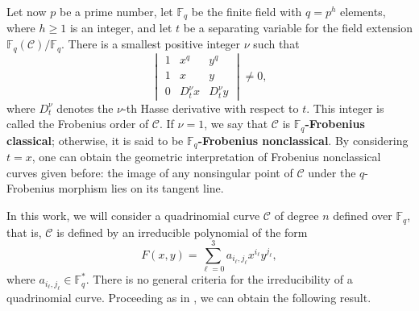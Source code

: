 \documentclass[preprint,12pt]{elsarticle}
\newtheorem{remark}[theorem]{Remark}
\begin{document}
Let now \( p \) be a prime number, let \( \mathbb{F}_q \) be the finite field with \( q = p^h \) elements, where \( h \geq 1 \) is an integer, and let $t$ be a separating variable for the field extension $\mathbb{F}_q(\mathcal{C}) / \mathbb{F}_q$. There is a smallest positive integer $\nu$ such that
\[
\begin{vmatrix}
1 & x^q & y^q \\
1 & x & y \\
0 & D_t^{\nu} x & D_t^{\nu} y
\end{vmatrix}
\neq 0,
\]
where $D_t^{\nu}$ denotes the $\nu$-th Hasse derivative with respect to $t$. This integer is called the Frobenius order  of \( \mathcal{C} \). If \( \nu = 1 \), we say that \( \mathcal{C} \) is \textbf{\( \mathbb{F}_q \)-Frobenius classical}; otherwise, it is said to be \textbf{\( \mathbb{F}_q \)-Frobenius nonclassical}. By considering $t = x$, one can obtain the geometric interpretation of Frobenius nonclassical curves given before: the image of any nonsingular point of $\mathcal{C}$ under the $q$-Frobenius morphism lies on its tangent line.


In this work, we will consider a quadrinomial curve \( \mathcal{C} \) of degree \( n \) defined over \( \mathbb{F}_q \), that is, \( \mathcal{C} \) is defined by an irreducible polynomial of the form
\[
F(x,y) = \sum_{\ell = 0}^{3} a_{i_\ell, j_\ell} x^{i_\ell} y^{j_\ell},
\]
where \( a_{i_\ell, j_\ell} \in \mathbb{F}_q^* \). There is no general criteria for the irreducibility of a quadrinomial curve. Proceeding as in \cite[Lemma 2.2]{nie}, we can obtain the following result.
\end{document}
